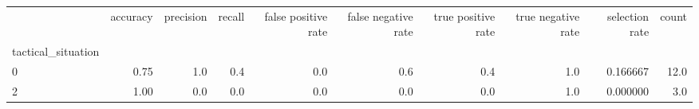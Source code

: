 \begin{tabular}{lrrrrrrrrr}
\toprule
{} &  accuracy &  precision &  recall &  false positive rate &  false negative rate &  true positive rate &  true negative rate &  selection rate &  count \\
tactical\_situation &           &            &         &                      &                      &                     &                     &                 &        \\
\midrule
0                  &      0.75 &        1.0 &     0.4 &                  0.0 &                  0.6 &                 0.4 &                 1.0 &        0.166667 &   12.0 \\
2                  &      1.00 &        0.0 &     0.0 &                  0.0 &                  0.0 &                 0.0 &                 1.0 &        0.000000 &    3.0 \\
\bottomrule
\end{tabular}
